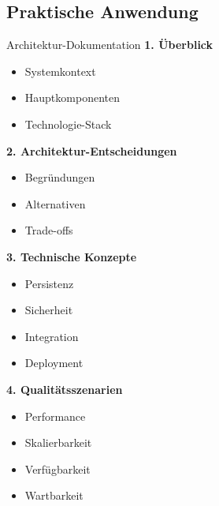 \subsection{Praktische Anwendung}

\begin{KR}{Architektur-Dokumentation}
\textbf{1. Überblick}
\begin{itemize}
    \item Systemkontext
    \item Hauptkomponenten
    \item Technologie-Stack
\end{itemize}

\textbf{2. Architektur-Entscheidungen}
\begin{itemize}
    \item Begründungen
    \item Alternativen
    \item Trade-offs
\end{itemize}

\textbf{3. Technische Konzepte}
\begin{itemize}
    \item Persistenz
    \item Sicherheit
    \item Integration
    \item Deployment
\end{itemize}

\textbf{4. Qualitätsszenarien}
\begin{itemize}
    \item Performance
    \item Skalierbarkeit
    \item Verfügbarkeit
    \item Wartbarkeit
\end{itemize}
\end{KR}


